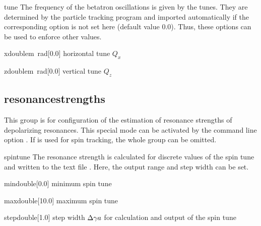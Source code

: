 \documentclass[a4paper]{scrartcl}
\begin{document}
\clearpage
\begin{configdocgroup}{tune}
  The frequency of the betatron oscillations is given by the tunes.
  They are determined by the particle tracking program and
  imported automatically if the corresponding option is not set here (default value
  \num{0.0}). Thus, these options can be used to enforce other values.\\[2mm]
  
  \begin{configdoc}{x}{double}{\si{\m\radian}}[0.0]
  horizontal tune $Q_x$
  \end{configdoc}
  \begin{configdoc}{z}{double}{\si{\m\radian}}[0.0]
    vertical tune $Q_z$
  \end{configdoc}
\end{configdocgroup}



\subsection{resonancestrengths}
\label{sec:config-resstr}
This group is for configuration of the estimation of resonance strengths of depolarizing
resonances. This special mode can be activated by the command line option .
If \polem is used for spin tracking, the whole group can be omitted.\\[2mm]

\begin{configdocgroup}{spintune}
  The resonance strength is calculated for discrete values of the spin tune \ga and
  written to the text file . Here, the output range and
  step width can be set.

  \begin{configdoc}{min}{double}{}[0.0]
    minimum spin tune \ga
  \end{configdoc}

  \begin{configdoc}{max}{double}{}[10.0]
    maximum spin tune \ga
  \end{configdoc}

  \begin{configdoc}{step}{double}{}[1.0]
    step width $\Delta\gamma a$ for calculation and output of the spin tune
  \end{configdoc}
\end{configdocgroup}
\end{document}
